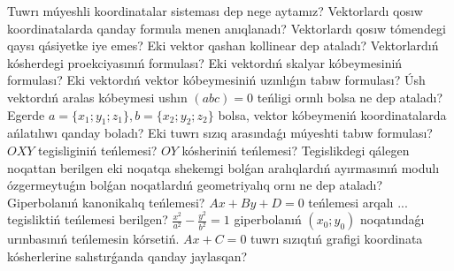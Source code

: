 Tuwrı múyeshli koordinatalar sisteması dep nege aytamız?
Vektorlardı qosıw koordinatalarda qanday formula menen anıqlanadı?
Vektorlardı qosıw tómendegi qaysı qásiyetke iye emes?
Eki vektor qashan kollinear dep ataladı?
Vektorlardıń kósherdegi proekciyasınıń formulası?
Eki vektordıń skalyar kóbeymesiniń formulası?
Eki vektordıń vektor kóbeymesiniń uzınlıǵın tabıw formulası?
Úsh vektordıń aralas kóbeymesi ushın \((abc) = 0\) teńligi orınlı bolsa ne dep ataladı?
Egerde \(a = \{ x_{1}; y_{1}; z_{1}\}, b = \{ x_{2}; y_{2}; z_{2}\}\) bolsa, vektor kóbeymeniń koordinatalarda ańlatılıwı qanday boladı?
Eki tuwrı sızıq arasındaǵı múyeshti tabıw formulası?
\(OXY\) tegisliginiń teńlemesi?
\(OY\) kósheriniń teńlemesi?
Tegislikdegi qálegen noqattan berilgen eki noqatqa shekemgi bolǵan aralıqlardıń ayırmasınıń modulı ózgermeytuǵın bolǵan noqatlardıń geometriyalıq ornı ne dep ataladı?
Giperbolanıń kanonikalıq teńlemesi?
\(Ax + By + D = 0\) teńlemesi arqalı ... tegisliktiń teńlemesi berilgen?
\(\frac{x^{2}}{a^{2}} - \frac{y^{2}}{b^{2}} = 1\) giperbolanıń \((x_{0};y_{0})\) noqatındaǵı urınbasınıń teńlemesin kórsetiń.
\(Ax + C = 0\) tuwrı sızıqtıń grafigi koordinata kósherlerine salıstırǵanda qanday jaylasqan?